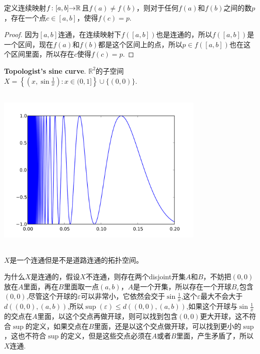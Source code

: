 \begin{theorem}
定义连续映射${f}\colon{[a,b]}{\to}{\mathbb{R}}$且$f(a) \neq f(b)$，则对于任何$f(a)$和$f(b)$之间的数$p$，存在一个点$c \in [a,b]$，使得$f(c) = p$.
\end{theorem}

\begin{proof}
因为$[a,b]$连通，在连续映射下$f([a,b])$也是连通的，所以$f([a,b])$是一个区间，现在$f(a)$和$f(b)$都是这个区间上的点，所以$p \in f([a,b])$也在这个区间里面，所以存在$c$使得$f(c) = p$.
\end{proof}

\begin{example}
\rm \textbf{Topologist's sine curve}. $\mathbb{R}^2$的子空间$X =  \left\{  \left( x, \sin \tfrac{1}{x}  \right ) :  x \in (0,1] \right\} \cup \{(0,0)\}.$
\begin{center}
\includegraphics[width=10cm, height=8cm]{images/Topologist's_sine_curve.png}
\end{center}
\end{example}

$X$是一个连通但是不是道路连通的拓扑空间。

为什么$X$是连通的，假设$X$不连通，则存在两个disjoint开集$A$和$B$，不妨把$(0,0)$放在$A$里面，再在$B$里面取一点$(a,b)$，$A$是一个开集，所以存在一个开球$B_\varepsilon$包含$(0,0)$,尽管这个开球的$\varepsilon$可以非常小，它依然会交于$\sin\frac{1}{x}$,这个$\varepsilon$最大不会大于$d((0,0),(a,b))$,所以$\sup(\varepsilon) \leq d((0,0),(a,b))$,如果这个开球与$\sin\frac{1}{x}$的交点在$A$里面，以这个交点再做开球，则可以找到包含$(0,0)$更大开球，这不符合$\sup$的定义，如果交点在$B$里面，还是以这个交点做开球，可以找到更小的$\sup$，这也不符合$\sup$的定义，但是这些交点必须在$A$或者$B$里面，产生矛盾了，所以$X$连通.


